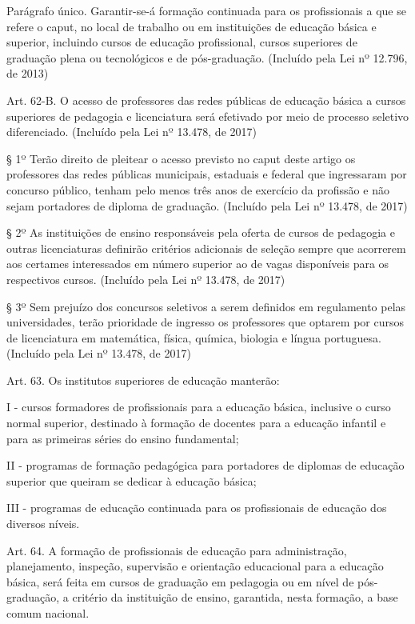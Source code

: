 \documentclass[
]{book}
\begin{document}
Parágrafo único. Garantir-se-á formação continuada para os profissionais a que se refere o caput, no local de trabalho ou em instituições de educação básica e superior, incluindo cursos de educação profissional, cursos superiores de graduação plena ou tecnológicos e de pós-graduação. (Incluído pela Lei nº 12.796, de 2013)

Art. 62-B. O acesso de professores das redes públicas de educação básica a cursos superiores de pedagogia e licenciatura será efetivado por meio de processo seletivo diferenciado. (Incluído pela Lei nº 13.478, de 2017)

§ 1º Terão direito de pleitear o acesso previsto no caput deste artigo os professores das redes públicas municipais, estaduais e federal que ingressaram por concurso público, tenham pelo menos três anos de exercício da profissão e não sejam portadores de diploma de graduação. (Incluído pela Lei nº 13.478, de 2017)

§ 2º As instituições de ensino responsáveis pela oferta de cursos de pedagogia e outras licenciaturas definirão critérios adicionais de seleção sempre que acorrerem aos certames interessados em número superior ao de vagas disponíveis para os respectivos cursos. (Incluído pela Lei nº 13.478, de 2017)

§ 3º Sem prejuízo dos concursos seletivos a serem definidos em regulamento pelas universidades, terão prioridade de ingresso os professores que optarem por cursos de licenciatura em matemática, física, química, biologia e língua portuguesa. (Incluído pela Lei nº 13.478, de 2017)

Art. 63. Os institutos superiores de educação manterão:

I - cursos formadores de profissionais para a educação básica, inclusive o curso normal superior, destinado à formação de docentes para a educação infantil e para as primeiras séries do ensino fundamental;

II - programas de formação pedagógica para portadores de diplomas de educação superior que queiram se dedicar à educação básica;

III - programas de educação continuada para os profissionais de educação dos diversos níveis.

Art. 64. A formação de profissionais de educação para administração, planejamento, inspeção, supervisão e orientação educacional para a educação básica, será feita em cursos de graduação em pedagogia ou em nível de pós-graduação, a critério da instituição de ensino, garantida, nesta formação, a base comum nacional.
\end{document}
